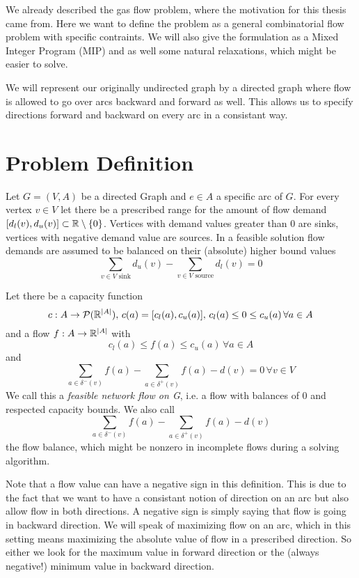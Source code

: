 We already described the gas flow problem, where the motivation for this thesis came from. Here we want to define the 
problem as a general combinatorial flow problem with specific contraints. We will also give the formulation as a Mixed 
Integer Program (MIP) and as well some natural relaxations, which might be easier to solve.

We will represent our originally undirected graph by a directed graph where flow is allowed to go over arcs backward 
and forward as well. This allows us to specify directions forward and backward on every arc in a consistant way. 
\section{Problem Definition}

\begin{definition}
 Let $G=(V,A)$ be a directed Graph and $e \in A$ a specific arc of $G$. For every vertex $v\in V$ let there be a 
prescribed range for the amount of flow demand $[d_l(v), d_u(v)]\subset \mathbb{R} \setminus \{0\}$. Vertices with demand 
values greater than 0 are sinks, vertices with negative demand value are sources. In a feasible solution flow 
demands are assumed to be balanced on their (absolute) higher bound values 
$$\sum_{v \in V\textrm{ sink}}d_u(v)-\sum_{v \in V\textrm{ source}}d_l(v)=0$$ 

Let there be a capacity function 
$$c:A\to \mathcal{P}(\mathbb{R}^{|A|}), \, c(a)=[c_l(a), c_u(a)],\, c_l(a)\le 0 \le c_u(a) \, \forall a\in A$$
and a flow  $f: A\to\mathbb{R}^{|A|} $ with $$c_l(a)\le f(a)\le 
c_u(a)\, \forall a\in A$$ and $$\sum_{a\in\delta^-(v)}f(a)-\sum_{a\in\delta^+(v)}f(a)-d(v) = 0 \, \forall v\in V$$
We call this a \textit{feasible network flow on G}, i.e. a flow with balances of 0 and respected capacity bounds.
We also call $$\sum_{a\in \delta^-(v)}f(a)-\sum_{a\in\delta^+(v)}f(a)-d(v)$$ the flow balance, which might be nonzero 
in incomplete flows during a solving algorithm.\\
\end{definition}
Note that a flow value can have a negative sign in this definition. This is due to the fact that we want to have a 
consistant notion of direction on an arc but also allow flow in both directions. A negative sign is simply saying that 
flow is going in backward direction. We will speak of maximizing flow on an arc, which in this setting means maximizing 
the absolute value of flow in a prescribed direction. So either we look for the maximum value in forward direction or 
the (always negative!) minimum value in backward direction.\\

